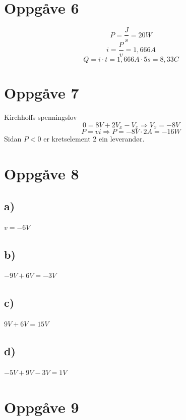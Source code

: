 \documentclass[12pt,a4paper]{article}
\begin{document}
  \section{Oppgåve 6}
    \begin{equation}
      P = \frac{J}{s} = 20W
    \end{equation}
    \begin{equation}
      i=\frac{P}{v}=1,666A
    \end{equation}
    \begin{equation}
      Q = i\cdot t = 1,666A \cdot 5s = 8,33C
    \end{equation}

  \newpage

  \section{Oppgåve 7}
    Kirchhoffs spenningslov
    \begin{equation}
      0 = 8V + 2V_{x} -V_{x}  \Rightarrow V_{x}=-8V
    \end{equation}
    \begin{equation}
      P = vi \Rightarrow P = -8V\cdot 2A = -16W 
    \end{equation}
    Sidan $P < 0$ er kretselement 2 ein leverandør.

  \section{Oppgåve 8}
    \subsection{a)}
      $v=-6V$

    \subsection{b)}
      $-9V+6V=-3V$

    \subsection{c)}
      $9V+6V=15V$

    \subsection{d)}
      $-5V+9V-3V=1V$
  
  \newpage

  \section{Oppgåve 9}
\end{document}
